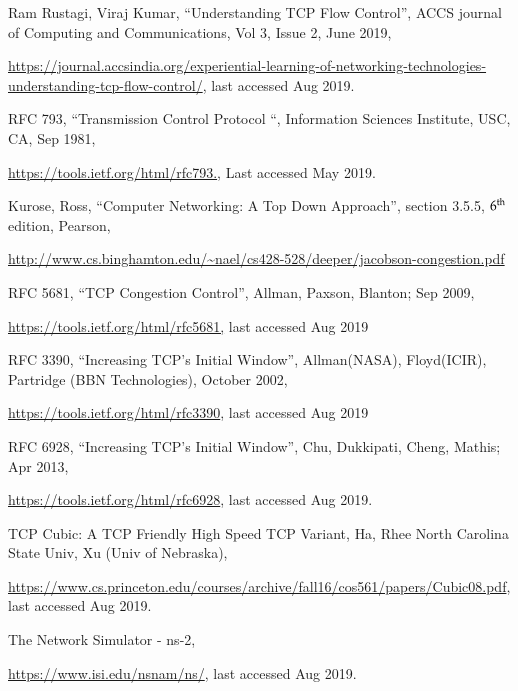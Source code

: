 \begin{multicols}{2}
\vskip -1.3cm

\hfill{}

\begin{thebibliography}{99}
 Ram Rustagi, Viraj Kumar, “Understanding TCP Flow Control”, ACCS journal of Computing and Communications, Vol 3, Issue 2, June 2019,

 \url{https://journal.accsindia.org/experiential-learning-of-networking-technologies-understanding-tcp-flow-control/}, last accessed Aug 2019.

  RFC 793, “Transmission Control Protocol “, Information Sciences Institute, USC, CA, Sep 1981,

\url{https://tools.ietf.org/html/rfc793.}, Last accessed May 2019.

 Kurose, Ross, “Computer Networking: A Top Down Approach”, section 3.5.5, ${\rm 6}^{\text{th}}$ edition, Pearson, 

 \url{http://www.cs.binghamton.edu/~nael/cs428-528/deeper/jacobson-congestion.pdf}

 RFC 5681, “TCP Congestion Control”, Allman, Paxson, Blanton; Sep 2009,

\url{https://tools.ietf.org/html/rfc5681,}  last accessed Aug 2019

RFC 3390, “Increasing TCP’s Initial Window”, Allman(NASA), Floyd(ICIR), Partridge (BBN Technologies), October 2002,

 \url{https://tools.ietf.org/html/rfc3390}, last accessed Aug 2019

  RFC 6928, “Increasing TCP’s Initial Window”, Chu, Dukkipati, Cheng, Mathis; Apr 2013, 

 \url{https://tools.ietf.org/html/rfc6928}, last accessed Aug 2019.

 TCP Cubic: A TCP Friendly High Speed TCP Variant, {Ha, Rhee} North Carolina State Univ, Xu (Univ of Nebraska),

\url{https://www.cs.princeton.edu/courses/archive/fall16/cos561/papers/Cubic08.pdf}, last accessed Aug 2019.

 The Network Simulator - ns-2,

\url{https://www.isi.edu/nsnam/ns/}, last accessed Aug 2019.


\end{thebibliography}
\end{multicols}
